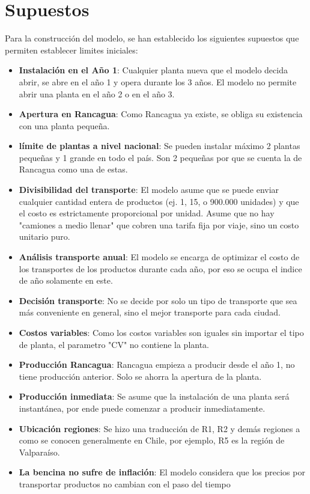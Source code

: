 \documentclass{article}
\begin{document}
\section{Supuestos}
Para la construcción del modelo, se han establecido los siguientes supuestos que permiten establecer limites iniciales:
\begin{itemize}
    \item \textbf{Instalación en el Año 1}: Cualquier planta nueva que el modelo decida abrir, se abre en el año 1 y opera durante los 3 años. El modelo no permite abrir una planta en el año 2 o en el año 3.
    \item \textbf{Apertura en Rancagua}: Como Rancagua ya existe, se obliga su existencia con una planta pequeña.
    \item \textbf{límite de plantas a nivel nacional}: Se pueden instalar máximo 2 plantas pequeñas y 1 grande en todo el país. Son 2 pequeñas por que se cuenta la de Rancagua como una de estas.
    \item \textbf{Divisibilidad del transporte}: El modelo asume que se puede enviar cualquier cantidad entera de productos (ej. 1, 15, o 900.000 unidades) y que el costo es estrictamente proporcional por unidad. Asume que no hay "camiones a medio llenar" que cobren una tarifa fija por viaje, sino un costo unitario puro.
    \item \textbf{Análisis transporte anual}: El modelo se encarga de optimizar el costo de los transportes de los productos durante cada año, por eso se ocupa el indice de año solamente en este.
    \item \textbf{Decisión transporte}: No se decide por solo un tipo de transporte que sea más conveniente en general, sino el mejor transporte para cada ciudad.
    \item \textbf{Costos variables}: Como los costos variables son iguales sin importar el tipo de planta, el parametro "CV" no contiene la planta.
    \item \textbf{Producción Rancagua}: Rancagua empieza a producir desde el año 1, no tiene producción anterior. Solo se ahorra la apertura de la planta.
    \item \textbf{Producción inmediata}: Se asume que la instalación de una planta será instantánea, por ende puede comenzar a producir inmediatamente.
    \item \textbf{Ubicación regiones}: Se hizo una traducción de R1, R2 y demás regiones a como se conocen generalmente en Chile, por ejemplo, R5 es la región de Valparaíso.
    \item \textbf{La bencina no sufre de inflación}: El modelo considera que los precios por transportar productos no cambian con el paso del tiempo
    
\end{itemize}
\end{document}
